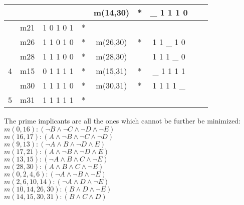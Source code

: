 \documentclass{article}
\begin{document}
\begin{center}
\begin{tabular}{ | c | c | c | c | c | c | c | c | c | }
            \hline
            &  &  &  & m(14,30) & * & \_ 1 1 1 0 &  &  \\
            \hline
            & m21 & 1 0 1 0 1 & * &  &  &  &  &  \\
            \hline
            & m26 & 1 1 0 1 0 & * & m(26,30) & * & 1 1 \_ 1 0 &  &  \\
            \hline
            & m28 & 1 1 1 0 0 & * & m(28,30) &  & 1 1 1 \_ 0 &  &  \\
            \hline
            4 & m15 & 0 1 1 1 1 & * & m(15,31) & * & \_ 1 1 1 1 &  &  \\
            \hline
            & m30 & 1 1 1 1 0 & * & m(30,31) & * & 1 1 1 1 \_ &  &  \\
            \hline
            5 & m31 & 1 1 1 1 1 & * &  &  &  &  &  \\
            \hline
        \end{tabular}
    \end{center}
	\clearpage
	
    The prime implicants are all the ones which cannot be further be minimized:\\
    
    $m(0, 16) : (\neg B \land \neg C \land \neg D \land \neg E)$\\
    
    $m(16, 17) : (A \land \neg B \land \neg C \land \neg D)$\\
    
    $m(9, 13) : (\neg A \land B \land \neg D \land E)$\\
    
    $m(17, 21) : (A \land \neg B \land \neg D \land E)$\\
    
    $m(13, 15) : (\neg A \land B \land C \land \neg E)$\\
    
    $m(28, 30) : (A \land B \land C \land \neg E)$\\
    
    $m(0, 2, 4, 6) : (\neg A \land \neg B \land \neg E)$\\
    
    $m(2, 6, 10, 14) : (\neg A \land D \land \neg E)$\\
    
    $m(10, 14, 26, 30) : (B \land D \land \neg E)$\\
    
    $m(14, 15, 30, 31) : (B \land C \land D)$\\
    \clearpage
\end{document}
